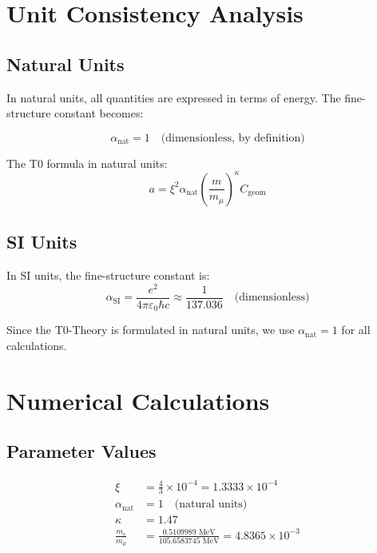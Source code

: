 \documentclass[12pt,a4paper]{article}
\newcommand{\xipar}{\xi}
\newcommand{\alphaSI}{\alpha_{\text{SI}}}
\newcommand{\alphaNAT}{\alpha_{\text{nat}}}
\newcommand{\Cgeom}{C_{\text{geom}}}
\newcommand{\kappaT}{\kappa}
\newcommand{\mmu}{m_{\mu}}
\newcommand{\melec}{m_{e}}
\begin{document}
	\section{Unit Consistency Analysis}
	
	\subsection{Natural Units}
	
	In natural units, all quantities are expressed in terms of energy. The fine-structure constant becomes:
	
	\begin{equation}
		\alphaNAT = 1 \quad \text{(dimensionless, by definition)}
	\end{equation}
	
	The T0 formula in natural units:
	\begin{equation}
		a = \xipar^2 \alphaNAT \left(\frac{m}{\mmu}\right)^{\kappaT} \Cgeom
	\end{equation}
	
	\subsection{SI Units}
	
	In SI units, the fine-structure constant is:
	\begin{equation}
		\alphaSI = \frac{e^2}{4\pi\varepsilon_0\hbar c} \approx \frac{1}{137.036} \quad \text{(dimensionless)}
	\end{equation}
	
	Since the T0-Theory is formulated in natural units, we use \(\alphaNAT = 1\) for all calculations.
	
	\section{Numerical Calculations}
	
	\subsection{Parameter Values}
	
	\begin{align}
		\xipar &= \frac{4}{3} \times 10^{-4} = 1.3333 \times 10^{-4} \\
		\alphaNAT &= 1 \quad \text{(natural units)} \\
		\kappaT &= 1.47 \\
		\frac{\melec}{\mmu} &= \frac{0.5109989 \text{ MeV}}{105.6583745 \text{ MeV}} = 4.8365 \times 10^{-3}
	\end{align}
	
\end{document}
